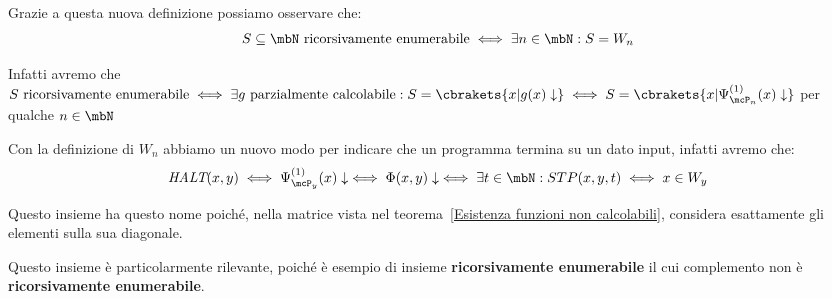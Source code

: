 
Grazie a questa nuova definizione possiamo osservare che:
\begin{equation}
    S \subseteq \mbN \text{ ricorsivamente enumerabile} \iff \exists n \in \mbN : S=W_n
\end{equation}

Infatti avremo che \(S \text{ ricorsivamente enumerabile} \iff \exists g \text{ parzialmente calcolabile}: S=\cbrakets{x\vert g(x)\downarrow} \iff S=\cbrakets{x\vert \Psi_{\mcP_n}^{(1)}(x)\downarrow}\) per qualche \(n \in \mbN\)

Con la definizione di \(W_n\) abbiamo un nuovo modo per indicare che un programma termina su un dato input, infatti avremo che:
\begin{equation}
  \textit{HALT}(x,y) \iff \Psi_{\mcP_y}^{(1)}(x)\downarrow \iff \Phi(x,y)\downarrow \iff \exists t \in \mbN : STP(x,y,t) \iff x \in W_y
\end{equation}


Questo insieme ha questo nome poiché, nella matrice vista nel teorema~\ref{Esistenza funzioni non calcolabili}, considera esattamente gli elementi sulla sua diagonale.

Questo insieme è particolarmente rilevante, poiché è esempio di insieme \textbf{ricorsivamente enumerabile} il cui complemento non è \textbf{ricorsivamente enumerabile}.

